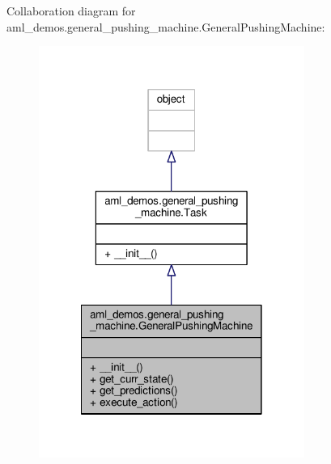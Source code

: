 Collaboration diagram for aml\-\_\-demos.\-general\-\_\-pushing\-\_\-machine.\-General\-Pushing\-Machine\-:\nopagebreak
\begin{figure}[H]
\begin{center}
\leavevmode
\includegraphics[width=246pt]{classaml__demos_1_1general__pushing__machine_1_1_general_pushing_machine__coll__graph}
\end{center}
\end{figure}
